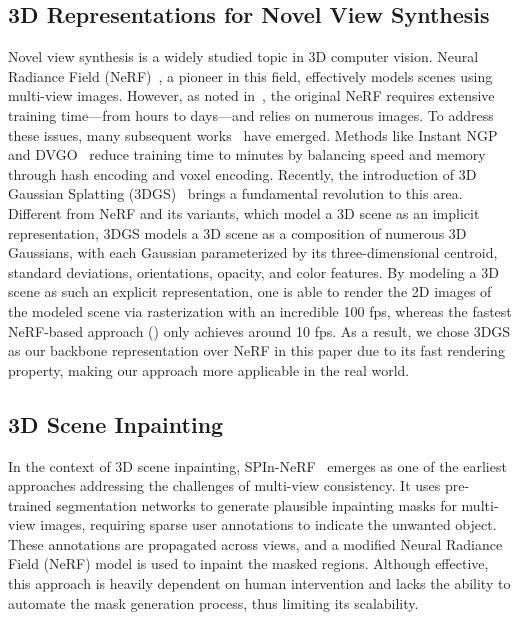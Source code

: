 \subsection{3D Representations for Novel View Synthesis}
\label{subsec:NVS}
Novel view synthesis is a widely studied topic in 3D computer vision. Neural Radiance Field (NeRF)~\cite{mildenhall2021nerforiginal}, a pioneer in this field, effectively models scenes using multi-view images. However, as noted in~\cite{deng2022depth}, the original NeRF requires extensive training time—from hours to days—and relies on numerous images. To address these issues, many subsequent works~\cite{muller2022instant, sun2022direct, yu2021plenoctrees, fridovich2022plenoxels} have emerged. Methods like Instant NGP~\cite{muller2022instant} and DVGO~\cite{sun2022direct} reduce training time to minutes by balancing speed and memory through hash encoding and voxel encoding. Recently, the introduction of 3D Gaussian Splatting (3DGS)~\cite{kerbl202333dgs} brings a fundamental revolution to this area. Different from NeRF and its variants, which model a 3D scene as an implicit representation, 3DGS models a 3D scene as a composition of numerous 3D Gaussians, with each Gaussian parameterized by its three-dimensional centroid, standard deviations, orientations, opacity, and color features. By modeling a 3D scene as such an explicit representation, one is able to render the 2D images of the modeled scene via rasterization with an incredible 100 fps, whereas the fastest NeRF-based approach (\cite{fridovich2022plenoxels, muller2022instant}) only achieves around 10 fps. As a result, we chose 3DGS as our backbone representation over NeRF in this paper due to its fast rendering property, making our approach more applicable in the real world. 
 


\subsection{3D Scene Inpainting}
\label{subsec:3Dinpaint}
In the context of 3D scene inpainting, SPIn-NeRF~\cite{mirzaei2023spin} emerges as one of the earliest approaches addressing the challenges of multi-view consistency. It uses pre-trained segmentation networks to generate plausible inpainting masks for multi-view images, requiring sparse user annotations to indicate the unwanted object. These annotations are propagated across views, and a modified Neural Radiance Field (NeRF) model is used to inpaint the masked regions. Although effective, this approach is heavily dependent on human intervention and lacks the ability to automate the mask generation process, thus limiting its scalability.



